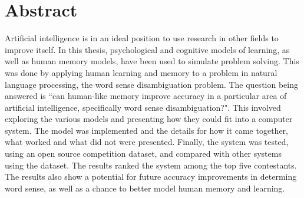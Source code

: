\doublespacing 
\chapter*{Abstract}

Artificial intelligence is in an ideal position to use research in other fields
to improve itself.  In this thesis, psychological and cognitive
models of learning, as well as human memory models, have been used to simulate problem
solving.  This was done by applying human learning and memory to a problem in
natural language processing, the word sense disambiguation problem. The question being 
answered is ``can human-like memory improve accuracy in a particular area of artificial
intelligence, specifically word sense disambiguation?". This involved exploring the 
various models and presenting how they could fit into a computer system.  The model was
implemented and the details for how it came together, what worked and what did not were
presented.  Finally, the system was tested, using an open source competition dataset, 
and compared with other systems using the dataset.  The results ranked the system among
the top five contestants. The results also show a potential for future accuracy 
improvements in determing word sense, as well as a chance to better model human memory 
and learning.
